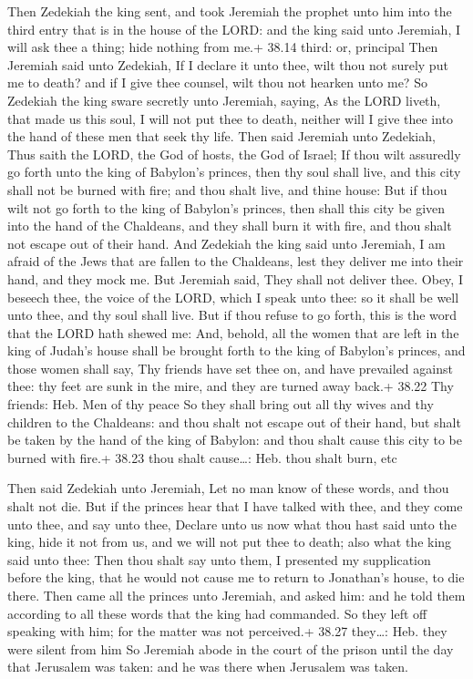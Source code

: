  Then Zedekiah the king sent, and took Jeremiah the
prophet unto him into the third entry that is in the house of the LORD:
and the king said unto Jeremiah, I will ask thee a thing; hide nothing
from me.+ 38.14 third: or, principal  Then Jeremiah said
unto Zedekiah, If I declare it unto thee, wilt thou not surely put me to
death? and if I give thee counsel, wilt thou not hearken unto me?
 So Zedekiah the king sware secretly unto Jeremiah, saying,
As the LORD liveth, that made us this soul, I will not put thee to
death, neither will I give thee into the hand of these men that seek thy
life.  Then said Jeremiah unto Zedekiah, Thus saith the
LORD, the God of hosts, the God of Israel; If thou wilt assuredly go
forth unto the king of Babylon's princes, then thy soul shall live, and
this city shall not be burned with fire; and thou shalt live, and thine
house:  But if thou wilt not go forth to the king of
Babylon's princes, then shall this city be given into the hand of the
Chaldeans, and they shall burn it with fire, and thou shalt not escape
out of their hand.  And Zedekiah the king said unto
Jeremiah, I am afraid of the Jews that are fallen to the Chaldeans, lest
they deliver me into their hand, and they mock me.  But
Jeremiah said, They shall not deliver thee. Obey, I beseech thee, the
voice of the LORD, which I speak unto thee: so it shall be well unto
thee, and thy soul shall live.  But if thou refuse to go
forth, this is the word that the LORD hath shewed me:  And,
behold, all the women that are left in the king of Judah's house shall
be brought forth to the king of Babylon's princes, and those women shall
say, Thy friends have set thee on, and have prevailed against thee: thy
feet are sunk in the mire, and they are turned away back.+ 38.22 Thy
friends: Heb. Men of thy peace  So they shall bring out all
thy wives and thy children to the Chaldeans: and thou shalt not escape
out of their hand, but shalt be taken by the hand of the king of
Babylon: and thou shalt cause this city to be burned with fire.+ 38.23
thou shalt cause\ldots: Heb. thou shalt burn, etc

 Then said Zedekiah unto Jeremiah, Let no man know of
these words, and thou shalt not die.  But if the princes
hear that I have talked with thee, and they come unto thee, and say unto
thee, Declare unto us now what thou hast said unto the king, hide it not
from us, and we will not put thee to death; also what the king said unto
thee:  Then thou shalt say unto them, I presented my
supplication before the king, that he would not cause me to return to
Jonathan's house, to die there.  Then came all the princes
unto Jeremiah, and asked him: and he told them according to all these
words that the king had commanded. So they left off speaking with him;
for the matter was not perceived.+ 38.27 they\ldots: Heb. they were
silent from him  So Jeremiah abode in the court of the
prison until the day that Jerusalem was taken: and he was there when
Jerusalem was taken.

